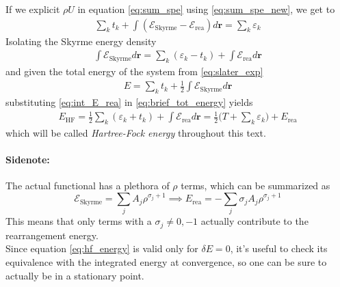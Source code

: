 If we explicit $\rho U$ in equation \eqref{eq:sum_spe} using \eqref{eq:sum_spe_new}, we get to
\begin{align*}
    \sum_k t_k + \int (\mathcal E_\text{Skyrme}-\mathcal E_\text{rea}) d\bm r = \sum_k \varepsilon_k 
\end{align*}
Isolating the Skyrme energy density
\begin{align}
    \label{eq:int_E_rea}
    \int \mathcal E_\text{Skyrme} d\bm r = \sum_k (\varepsilon_k -t_k) + \int \mathcal E_\text{rea} d\bm r
\end{align}
and given the total energy of the system from \eqref{eq:slater_exp}
\begin{align}
    \label{eq:brief_tot_energy}
E=\sum_k t_k + \frac 1 2 \int \mathcal E_\text{Skyrme} d\bm r 
\end{align}
substituting \eqref{eq:int_E_rea} in \eqref{eq:brief_tot_energy} yields
\begin{align}
    \label{eq:hf_energy}
E_\text{HF} = \frac 1 2 \sum_k (\varepsilon_k + t_k) +\int \mathcal E_\text{rea} d\bm r = \frac 1 2 \bigg(T+\sum_k\varepsilon_k\bigg) +E_\text{rea}
\end{align}
which will be called \textit{Hartree-Fock energy} throughout this text.
\paragraph{Sidenote:}
The actual functional has a plethora of $\rho$ terms, which can be summarized as
\begin{equation*}
    \mathcal E_\text{Skyrme} = \sum_j A_j \rho^{\sigma_j+1} \implies E_\text{rea} = -\sum_j \sigma_j A_j \rho^{\sigma_j+1} 
\end{equation*}
This means that only terms with a $\sigma_j\neq 0, -1$ actually contribute to the rearrangement energy.
\\Since equation \eqref{eq:hf_energy} is valid only for $\delta E = 0$, it's useful to check its equivalence with the integrated energy at convergence, so one can be sure to actually be in a stationary point.